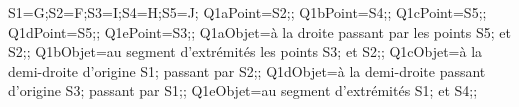 \documentclass[exercice]{thedocument}%
\begin{document}
%
    \>S1=G;\>S2=F;\>S3=I;\>S4=H;\>S5=J;%
    \>Q1aPoint={\<S2;};%
    \>Q1bPoint={\<S4;};%
    \>Q1cPoint={\<S5;};%
    \>Q1dPoint={\<S5;};%
    \>Q1ePoint={\<S3;};%
    \>Q1aObjet={à la droite passant par les points \<S5; et \<S2;};%
    \>Q1bObjet={au segment d'extrémités les points \<S3; et \<S2;};%
    \>Q1cObjet={à la demi-droite d'origine \<S1; passant par \<S2;};%
    \>Q1dObjet={à la demi-droite passant d'origine \<S3; passant par \<S1;};%
    \>Q1eObjet={au segment d'extrémités \<S1; et \<S4;};%
\end{document}
